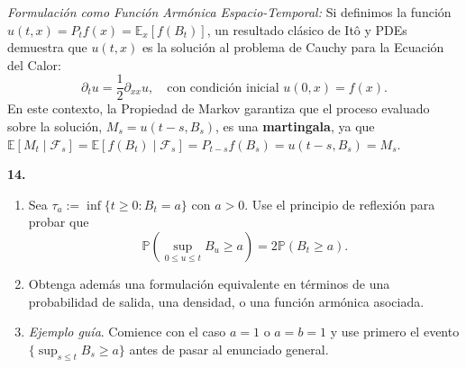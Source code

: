 \documentclass[11pt, letterpaper]{article}
\begin{document}
\begin{solucion}
    \textit{Formulación como Función Armónica Espacio-Temporal:}
    Si definimos la función $u(t, x) = P_t f(x) = \mathbb{E}_x[f(B_t)]$, un resultado clásico de Itô y PDEs demuestra que $u(t,x)$ es la solución al problema de Cauchy para la Ecuación del Calor:
    \[ \partial_t u = \frac{1}{2} \partial_{xx} u, \quad \text{con condición inicial } u(0, x) = f(x). \]
    En este contexto, la Propiedad de Markov garantiza que el proceso evaluado sobre la solución, $M_s = u(t-s, B_s)$, es una \textbf{martingala}, ya que $\mathbb{E}[M_t \mid \mathcal{F}_s] = \mathbb{E}[f(B_t) \mid \mathcal{F}_s] = P_{t-s}f(B_s) = u(t-s, B_s) = M_s$.
\end{solucion}

\newpage

\begin{ejercicio}
    \textbf{14.} 
    \begin{enumerate}
        \item Sea $\tau_a := \inf\{t \ge 0 : B_t = a\}$ con $a > 0$. Use el principio de reflexión para probar que
        \[ \mathbb{P}\left( \sup_{0 \le u \le t} B_u \ge a \right) = 2\mathbb{P}(B_t \ge a). \]
        \item Obtenga además una formulación equivalente en términos de una probabilidad de salida, una densidad, o una función armónica asociada.
        \item \textit{Ejemplo guía}. Comience con el caso $a = 1$ o $a = b = 1$ y use primero el evento $\{\sup_{s \le t} B_s \ge a\}$ antes de pasar al enunciado general.
    \end{enumerate}
\end{ejercicio}

\vspace{5mm}
\end{document}
